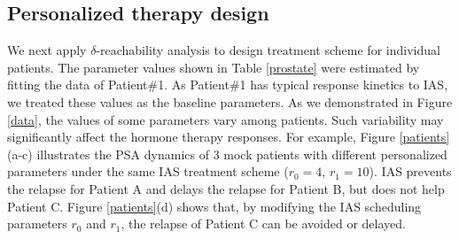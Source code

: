 \subsection{Personalized therapy design}
We next apply $\delta$-reachability analysis to design treatment scheme for individual patients. The parameter values shown in Table \ref{prostate} were estimated by fitting the data of Patient\#1. As Patient\#1 has typical response kinetics to IAS, we treated these values as the baseline parameters. As we demonstrated in Figure \ref{data}, the values of some parameters vary among patients. Such variability may significantly affect the hormone therapy responses. 
%
%
%
For example, Figure \ref{patients}(a-c) illustrates the PSA dynamics of $3$ mock patients with different personalized parameters under the same IAS treatment scheme ($r_0=4$, $r_1=10$). IAS prevents the relapse for Patient A and delays the relapse for Patient B, but does not help Patient C. Figure \ref{patients}(d) shows that, by modifying the IAS scheduling parameters $r_0$ and $r_1$, the relapse of Patient C can be avoided or delayed. 

